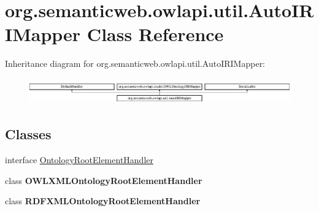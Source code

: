 \hypertarget{classorg_1_1semanticweb_1_1owlapi_1_1util_1_1_auto_i_r_i_mapper}{\section{org.\-semanticweb.\-owlapi.\-util.\-Auto\-I\-R\-I\-Mapper Class Reference}
\label{classorg_1_1semanticweb_1_1owlapi_1_1util_1_1_auto_i_r_i_mapper}
}
Inheritance diagram for org.\-semanticweb.\-owlapi.\-util.\-Auto\-I\-R\-I\-Mapper\-:\begin{figure}[H]
\begin{center}
\leavevmode
\includegraphics[height=1.121121cm]{classorg_1_1semanticweb_1_1owlapi_1_1util_1_1_auto_i_r_i_mapper}
\end{center}
\end{figure}
\subsection*{Classes}
\begin{DoxyCompactItemize}
\item 
interface \hyperlink{interfaceorg_1_1semanticweb_1_1owlapi_1_1util_1_1_auto_i_r_i_mapper_1_1_ontology_root_element_handler}{Ontology\-Root\-Element\-Handler}
\item 
class {\bfseries O\-W\-L\-X\-M\-L\-Ontology\-Root\-Element\-Handler}
\item 
class {\bfseries R\-D\-F\-X\-M\-L\-Ontology\-Root\-Element\-Handler}
\end{DoxyCompactItemize}
